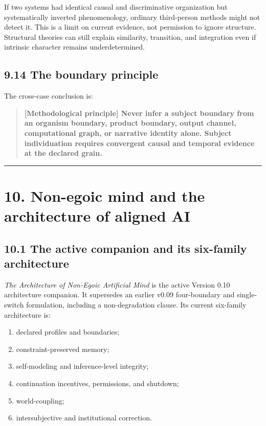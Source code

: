 \documentclass[
  11pt,
]{article}
\providecommand{\tightlist}{%
  \setlength{\itemsep}{0pt}\setlength{\parskip}{0pt}}
\begin{document}
If two systems had identical causal and discriminative organization but
systematically inverted phenomenology, ordinary third-person methods
might not detect it. This is a limit on current evidence, not permission
to ignore structure. Structural theories can still explain similarity,
transition, and integration even if intrinsic character remains
underdetermined.

\subsection{9.14 The boundary principle}\label{the-boundary-principle}

The cross-case conclusion is:

\begin{quote}
\textbf{{[}Methodological principle{]} Never infer a subject boundary
from an organism boundary, product boundary, output channel,
computational graph, or narrative identity alone. Subject individuation
requires convergent causal and temporal evidence at the declared grain.}
\end{quote}

\begin{center}\rule{0.5\linewidth}{0.5pt}\end{center}

\section{10. Non-egoic mind and the architecture of aligned
AI}\label{non-egoic-mind-and-the-architecture-of-aligned-ai}

\subsection{10.1 The active companion and its six-family
architecture}\label{the-active-companion-and-its-six-family-architecture}

\emph{The Architecture of Non-Egoic Artificial Mind} is the active
Version 0.10 architecture companion. It supersedes an earlier v0.09
four-boundary and single-switch formulation, including a non-degradation
clause. Its current six-family architecture is:

\begin{enumerate}
\def\labelenumi{\arabic{enumi}.}
\tightlist
\item
  declared profiles and boundaries;
\item
  constraint-preserved memory;
\item
  self-modeling and inference-level integrity;
\item
  continuation incentives, permissions, and shutdown;
\item
  world-coupling;
\item
  intersubjective and institutional correction.
\end{enumerate}
\end{document}
